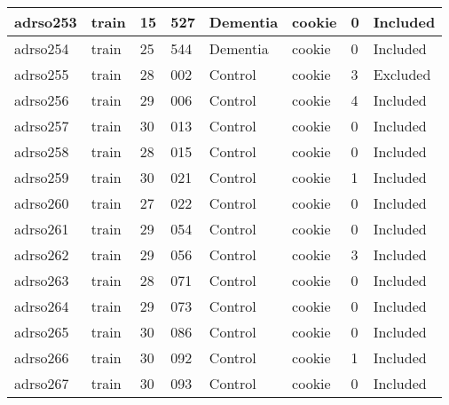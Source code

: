 \begin{center}
\begin{longtable}{|l|l|l|l|l|l|l|l|}
adrso253  & train            & 15           & 527         & Dementia             & cookie          & 0                & Included      \\ \hline
adrso254  & train            & 25           & 544         & Dementia             & cookie          & 0                & Included      \\ \hline
adrso255  & train            & 28           & 002         & Control              & cookie          & 3                & Excluded      \\ \hline
adrso256  & train            & 29           & 006         & Control              & cookie          & 4                & Included      \\ \hline
adrso257  & train            & 30           & 013         & Control              & cookie          & 0                & Included      \\ \hline
adrso258  & train            & 28           & 015         & Control              & cookie          & 0                & Included      \\ \hline
adrso259  & train            & 30           & 021         & Control              & cookie          & 1                & Included      \\ \hline
adrso260  & train            & 27           & 022         & Control              & cookie          & 0                & Included      \\ \hline
adrso261  & train            & 29           & 054         & Control              & cookie          & 0                & Included      \\ \hline
adrso262  & train            & 29           & 056         & Control              & cookie          & 3                & Included      \\ \hline
adrso263  & train            & 28           & 071         & Control              & cookie          & 0                & Included      \\ \hline
adrso264  & train            & 29           & 073         & Control              & cookie          & 0                & Included      \\ \hline
adrso265  & train            & 30           & 086         & Control              & cookie          & 0                & Included      \\ \hline
adrso266  & train            & 30           & 092         & Control              & cookie          & 1                & Included      \\ \hline
adrso267  & train            & 30           & 093         & Control              & cookie          & 0                & Included      \\ \hline

\end{longtable}
\end{center}
